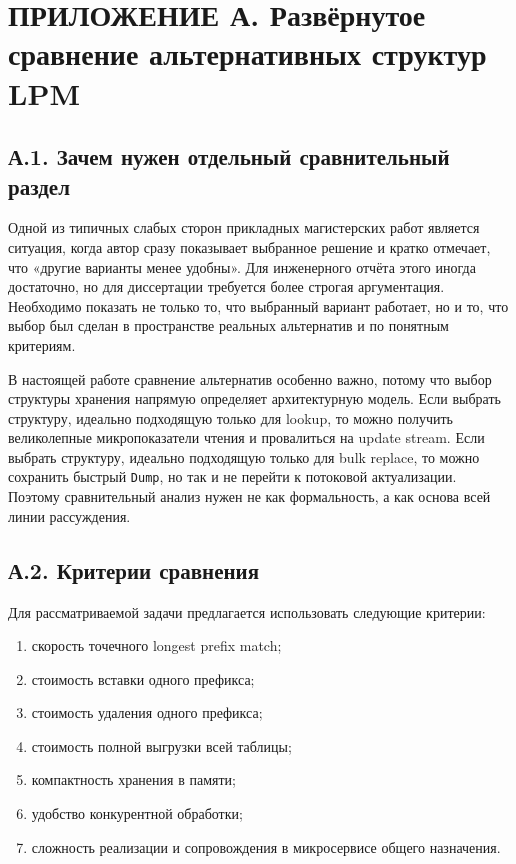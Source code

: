 \section*{ПРИЛОЖЕНИЕ А. Развёрнутое сравнение альтернативных структур LPM}

\subsection*{А.1. Зачем нужен отдельный сравнительный раздел}

Одной из типичных слабых сторон прикладных магистерских работ
является ситуация, когда автор сразу показывает выбранное решение и
кратко отмечает, что «другие варианты менее удобны». Для инженерного
отчёта этого иногда достаточно, но для диссертации требуется более
строгая аргументация. Необходимо показать не только то, что выбранный
вариант работает, но и то, что выбор был сделан в пространстве
реальных альтернатив и по понятным критериям.

В настоящей работе сравнение альтернатив особенно важно, потому что
выбор структуры хранения напрямую определяет архитектурную модель.
Если выбрать структуру, идеально подходящую только для lookup, то
можно получить великолепные микропоказатели чтения и провалиться на
update stream. Если выбрать структуру, идеально подходящую только для
bulk replace, то можно сохранить быстрый \texttt{Dump}, но так и не
перейти к потоковой актуализации. Поэтому сравнительный анализ нужен
не как формальность, а как основа всей линии рассуждения.

\subsection*{А.2. Критерии сравнения}

Для рассматриваемой задачи предлагается использовать следующие
критерии:

\begin{enumerate}
\item скорость точечного longest prefix match;
\item стоимость вставки одного префикса;
\item стоимость удаления одного префикса;
\item стоимость полной выгрузки всей таблицы;
\item компактность хранения в памяти;
\item удобство конкурентной обработки;
\item сложность реализации и сопровождения в микросервисе общего
назначения.
\end{enumerate}

